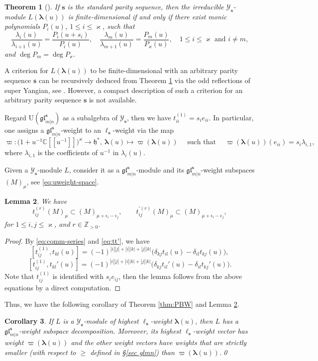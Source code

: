 \documentclass[11pt,reqno]{amsart}
\numberwithin{equation}{section}
\newtheorem{thm}{Theorem}[section]
\newtheorem{lem}[thm]{Lemma}
\newtheorem{cor}[thm]{Corollary}
\theoremstyle{definition}
\theoremstyle{remark}
\newcommand{\beq}{\begin{equation}}
\newcommand{\eeq}{\end{equation}}
\newcommand{\C}{\mathbb{C}}
\newcommand{\h}{\mathfrak{h}}
\newcommand{\bZ}{\mathbb{Z}}
\newcommand{\gge}{\geqslant}
\newcommand{\lle}{\leqslant}
\newcommand{\la}{\lambda}
\newcommand{\bla}{\bm\lambda}
\newcommand{\glMN}{\mathfrak{gl}_{m|n}^{\bm s}}
\newcommand{\UglMN}{\mathrm{U}(\mathfrak{gl}_{m|n}^\s)}
\newcommand{\YglMN}{\mathscr{Y}_{\bm s}}
\newcommand{\YMN}{{\mathscr{Y}_{\bm s}}}
\newcommand{\ka}{\varkappa}
\newcommand{\s}{{\bm s}}
\begin{document}
\begin{thm}[\cite{Zhang1996super}]\label{thm:zhang}
If $\s$ is the standard parity sequence, then the irreducible $\YMN$-module $L(\bla(u))$ is finite-dimensional if and only if there exist monic polynomials $P_i(u)$, $1\lle i\lle \ka$, such that
\[
\frac{\la_i(u)}{\la_{i+1}(u)}=\frac{P_i(u+s_i)}{P_i(u)},\quad \frac{\la_m(u)}{\la_{m+1}(u)}=\frac{P_m(u)}{P_{\ka}(u)}, \quad 1\lle i\lle \ka \text{ and } i\ne m,
\]
and $\deg P_m=\deg P_{\ka}$.
\end{thm}

A criterion for $L(\bla(u))$ to be finite-dimensional with an arbitrary parity sequence $\s$ can be recursively deduced from Theorem \ref{thm:zhang} via the odd reflections of super Yangian, see \cite{Molev2022odd,Lu2022note}. However, a compact description of such a criterion for an arbitrary parity sequence $\s$ is not available.

Regard $\UglMN$ as a subalgebra of $\YglMN$, then we have $t_{ii}^{(1)}=s_ie_{ii}$. In particular, one assigns a $\glMN$-weight to an $\ell_\s$-weight via the map
\beq\label{varpi1}
\varpi: \big(1+u^{-1}\C[[u^{-1}]]\big)^{\ka}\to \h^*,\ \bm\la(u)\mapsto \varpi(\bm\la(u))\quad \text{ such that } \quad \varpi(\bm\la(u))(e_{ii})=s_i\la_{i,1},
\eeq
where $\la_{i,1}$ is the coefficients of $u^{-1}$ in $\la_i(u)$.

Given a $\YglMN$-module $L$, consider it as a $\glMN$-module and its $\glMN$-weight subspaces $(M)_{\mu}$, see \eqref{eq:uweight-space}.
\begin{lem}\label{lem:wt-change}
We have
\[
t_{ij}^{(r)}(M)_{\mu}\subset (M)_{\mu+\epsilon_i-\epsilon_j},\qquad t_{ij}^{\prime (r)}(M)_{\mu}\subset (M)_{\mu+\epsilon_i-\epsilon_j},
\]
for $1\lle i, j\lle \ka$, and $r\in\bZ_{>0}$.
\end{lem}
\begin{proof}
By \eqref{eq:comm-series} and \eqref{eq:tt'}, we have
\beq\label{eq:1st-node-tt}
[t_{ij}^{(1)},t_{kl}(u)]=(-1)^{|i||j|+|i||k|+|j||k|}\big(\delta_{kj}t_{il}(u)-\delta_{il}t_{kj}(u)\big),
\eeq
\beq\label{eq:1st-node-tt'}
[t_{ij}^{(1)},t_{kl}'(u)]=(-1)^{|i||j|+|i||k|+|j||k|}\big(\delta_{kj}t_{il}'(u)-\delta_{il}t_{kj}'(u)\big).
\eeq
Note that $t_{ij}^{(1)}$ is identified with $s_ie_{ij}$, then the lemma follows from the above equations by a direct computation.
\end{proof}

Thus, we have the following corollary of Theorem \ref{thm:PBW} and Lemma \ref{lem:wt-change}.
\begin{cor}\label{cor:hwrt}
If $L$ is a $\YMN$-module of highest $\ell_\s$-weight $\bla(u)$, then $L$ has a $\glMN$-weight subspace decomposition. Moreover, its highest $\ell_\s$-weight vector has weight $\varpi(\bla(u))$ and the other weight vectors have weights that are strictly smaller (with respect to $\gge$ defined in \S \ref{sec glmn}) than $\varpi(\bla(u))$.\qed
\end{cor}
\end{document}
